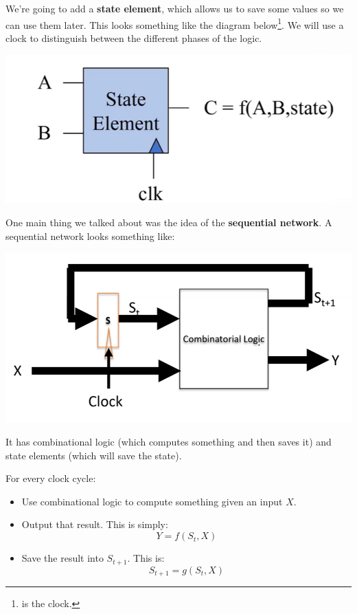 \documentclass[letterpaper]{article}
\begin{document}
\bigskip 

We're going to add a \textbf{state element}, which allows us to save some values so we can use them later. This looks something like the diagram below\footnote{ is the clock.}. We will use a clock to distinguish between the different phases of the logic. 
\begin{center}
    \includegraphics[scale=0.5]{state_element.PNG}
\end{center}
One main thing we talked about was the idea of the \textbf{sequential network}. A sequential network looks something like: 
\begin{center}
    \includegraphics[scale=0.3]{sequential_network.PNG}
\end{center}

It has combinational logic (which computes something and then saves it) and state elements (which will save the state).

\bigskip 

For every clock cycle:
\begin{itemize}
    \item Use combinational logic to compute something given an input $X$. 
    \item Output that result. This is simply:
    \[Y = f(S_t, X)\]
    \item Save the result into $S_{t + 1}$. This is:
    \[S_{t + 1} = g(S_t, X)\]
\end{itemize}
\end{document}
